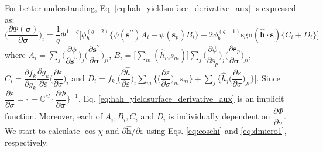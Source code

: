\documentclass[12pt]{amsart}
\begin{document}
For better understanding, Eq. \ref{eq:hah_yieldsurface_derivative_aux} is expressed as:
\begin{equation}
  \label{eq:hah_yieldsurface_derivative_short}
  \bigg(\dfrac{\partial\Phi(\mathbf{\sigma})}{\partial\mathbf{\sigma}}\bigg)_i=\frac{1}{q}\Phi^{1-q}\bigg[\phi_h^{(q-2)}\bigg\{\psi(\mathbf{s}^{\prime\prime})A_i+\psi(\mathbf{s}_p)B_i\bigg\}+2\phi_b^{(q-1)}\text{sgn}(\hat{\mathbf{h}}\cdot\mathbf{s})\bigg\{C_i+ D_i\bigg\} \bigg]
\end{equation}
where $A_{i}=\sum_j\bigg(\dfrac{\partial\phi}{\partial\mathbf{s}^{\prime\prime}}\bigg)_{j}\bigg(\dfrac{\partial\mathbf{s}^{\prime\prime}}{\partial\mathbf{\sigma}}\bigg)_{ji}$, $B_{i}=\bigg[\sum_m(\hat{h}_ms_m)\bigg]\sum_j\bigg(\dfrac{\partial\phi}{\partial\mathbf{s}_p}\bigg)_{j}\bigg(\dfrac{\partial\mathbf{s}_p}{\partial\mathbf{\sigma}}\bigg)_{ji}$,$C_i=\dfrac{\partial f_k}{\partial g_k}\dfrac{\partial g_k}{\partial \bar{\varepsilon}}\bigg(\dfrac{\partial\bar{\varepsilon}}{\partial\sigma}\bigg)_{i}$ and $D_i= f_k\bigg[\bigg(\dfrac{\partial\hat{h}}{\partial\bar{\varepsilon}}\bigg)_i\sum_m\bigg\{{\bigg(\dfrac{\partial\bar{\varepsilon}}{\partial\sigma}\bigg)_m s_m}\bigg\}+\sum_j\bigg\{\hat{h}_j\bigg(\dfrac{\partial s}{\partial\sigma}\bigg)_{ji}\bigg\} \bigg]$.
Since $\dfrac{\partial\bar{\varepsilon}}{\partial\sigma}=\bigg\{-\mathbb{C}^{el}\cdot\dfrac{\partial\Phi}{\partial\mathbf{\sigma}}\bigg\}^{-1}$, Eq. \ref{eq:hah_yieldsurface_derivative_aux} is an implicit function.
Moreover, each of $A_i, B_i, C_i$ and $D_i$ is individually dependent on $\dfrac{\partial\Phi}{\partial\sigma}$.
We start to calculate $\cos\chi$ and $\partial \hat{\mathbf{h}}/\partial \bar{\varepsilon}$ using Eqs. \ref{eq:coschi} and \ref{eq:dmicro1}, respectively.
\end{document}
